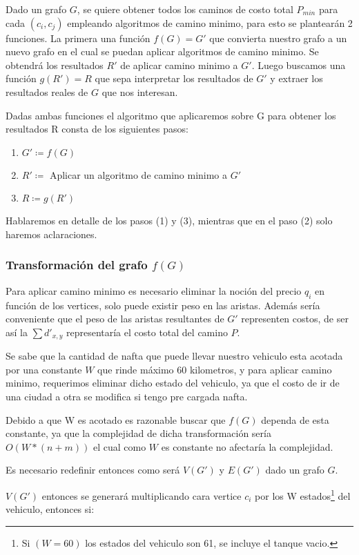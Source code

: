 \documentclass[12pt]{article}
\def\is{\coloneqq}
\begin{document}
Dado un grafo $G$, se quiere obtener todos los caminos de costo total $P_{min}$ para cada $(c_i, c_j)$  empleando algoritmos de camino minimo, para esto se plantearán 2 funciones. La primera una función $f(G) = G'$ que convierta nuestro grafo a un nuevo grafo en el cual se puedan aplicar algoritmos de camino minimo. Se obtendrá los resultados $R'$ de aplicar camino minimo a $G'$. Luego buscamos una función $g(R') = R$ que sepa interpretar los resultados de $G'$ y extraer los resultados reales de $G$ que nos interesan.

Dadas ambas funciones el algoritmo que aplicaremos sobre G para obtener los resultados R consta de los siguientes pasos:

\begin{enumerate}
	\item $G' \is f(G)$
	\item $R' \is$ Aplicar un algoritmo de camino minimo a $G'$
	\item $R \is g(R')$
\end{enumerate}

Hablaremos en detalle de los pasos (1) y (3), mientras que en el paso (2) solo haremos aclaraciones.

\subsubsection{Transformación del grafo $f(G)$}

Para aplicar camino minimo es necesario eliminar la noción del precio $q_i$ en función de los vertices, solo puede existir peso en las aristas. Además sería conveniente que el peso de las aristas resultantes de $G'$ representen costos, de ser así la $\sum d'_{x,y}$ representaría el costo total del camino $P$.  

Se sabe que la cantidad de nafta que puede llevar nuestro vehiculo esta acotada por una constante $W$ que rinde máximo 60 kilometros, y para aplicar camino minimo, requerimos eliminar dicho estado del vehiculo, ya que el costo de ir de una ciudad a otra se modifica si tengo pre cargada nafta. 

Debido a que W es acotado es razonable buscar que $f(G)$ dependa de esta constante, ya que la complejidad de dicha transformación sería $O(W * (n + m))$ el cual como $W$ es constante no afectaría la complejidad.

Es necesario redefinir entonces como será $V(G')$ y $E(G')$ dado un grafo $G$. 

$V(G')$ entonces se generará multiplicando cara vertice $c_i$ por los W estados\footnote{Si $(W = 60)$ los estados del vehiculo son 61, se incluye el tanque vacio.} del vehiculo, entonces si:
\end{document}
